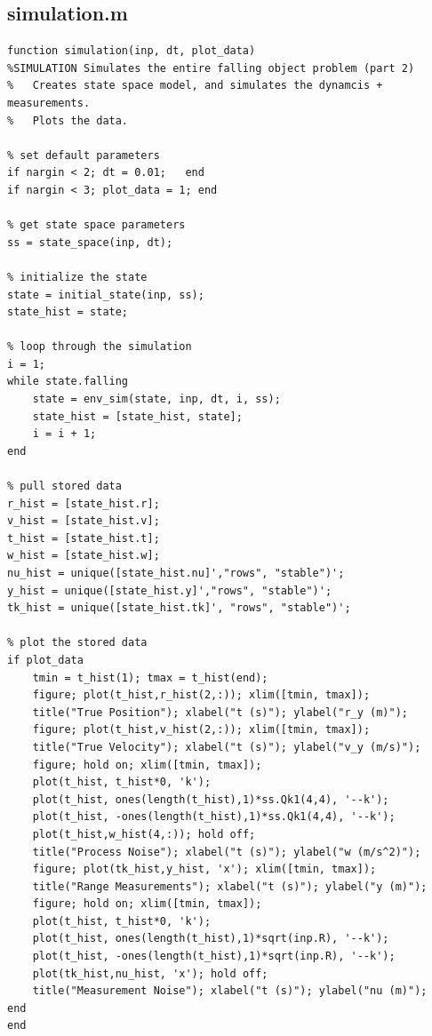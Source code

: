 \documentclass{article}
\begin{document}
\subsection{simulation.m}
\begin{lstlisting}[style=Matlab-editor]
function simulation(inp, dt, plot_data)
%SIMULATION Simulates the entire falling object problem (part 2)
%   Creates state space model, and simulates the dynamcis + measurements.
%   Plots the data.

% set default parameters
if nargin < 2; dt = 0.01;   end
if nargin < 3; plot_data = 1; end

% get state space parameters
ss = state_space(inp, dt);

% initialize the state
state = initial_state(inp, ss);
state_hist = state;

% loop through the simulation
i = 1;
while state.falling
    state = env_sim(state, inp, dt, i, ss);
    state_hist = [state_hist, state];
    i = i + 1;
end

% pull stored data
r_hist = [state_hist.r];
v_hist = [state_hist.v];
t_hist = [state_hist.t];
w_hist = [state_hist.w];
nu_hist = unique([state_hist.nu]',"rows", "stable")';
y_hist = unique([state_hist.y]',"rows", "stable")';
tk_hist = unique([state_hist.tk]', "rows", "stable")';

% plot the stored data
if plot_data
    tmin = t_hist(1); tmax = t_hist(end);
    figure; plot(t_hist,r_hist(2,:)); xlim([tmin, tmax]);
    title("True Position"); xlabel("t (s)"); ylabel("r_y (m)");
    figure; plot(t_hist,v_hist(2,:)); xlim([tmin, tmax]);
    title("True Velocity"); xlabel("t (s)"); ylabel("v_y (m/s)");
    figure; hold on; xlim([tmin, tmax]);
    plot(t_hist, t_hist*0, 'k');
    plot(t_hist, ones(length(t_hist),1)*ss.Qk1(4,4), '--k');
    plot(t_hist, -ones(length(t_hist),1)*ss.Qk1(4,4), '--k');
    plot(t_hist,w_hist(4,:)); hold off;
    title("Process Noise"); xlabel("t (s)"); ylabel("w (m/s^2)");
    figure; plot(tk_hist,y_hist, 'x'); xlim([tmin, tmax]);
    title("Range Measurements"); xlabel("t (s)"); ylabel("y (m)");
    figure; hold on; xlim([tmin, tmax]);
    plot(t_hist, t_hist*0, 'k');
    plot(t_hist, ones(length(t_hist),1)*sqrt(inp.R), '--k');
    plot(t_hist, -ones(length(t_hist),1)*sqrt(inp.R), '--k');
    plot(tk_hist,nu_hist, 'x'); hold off;
    title("Measurement Noise"); xlabel("t (s)"); ylabel("nu (m)");
end
end

\end{lstlisting}
\end{document}
